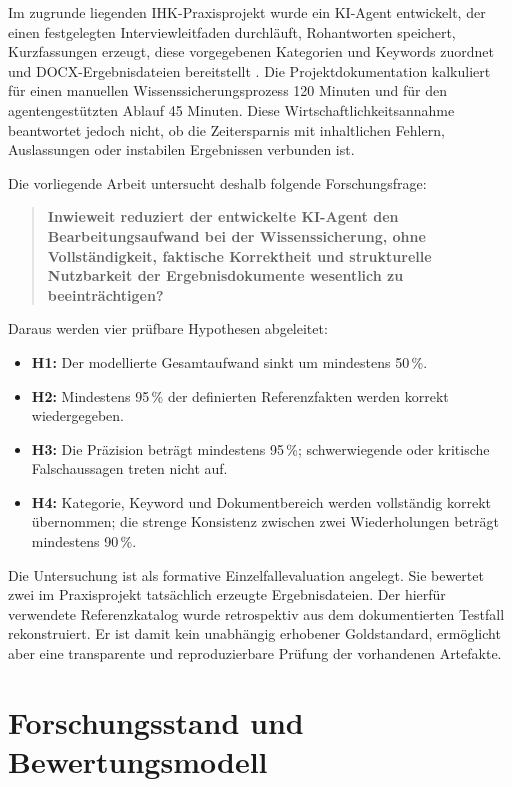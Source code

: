 \documentclass[
  10pt,
  ngerman,
  a4paper,
  toc=graduated,
  numbers=noenddot,
  headings=standardclasses
]{scrartcl}
\newcommand{\pct}[1]{#1\,\%}
\begin{document}
Im zugrunde liegenden IHK-Praxisprojekt wurde ein KI-Agent entwickelt, der einen festgelegten Interviewleitfaden durchläuft, Rohantworten speichert, Kurzfassungen erzeugt, diese vorgegebenen Kategorien und Keywords zuordnet und DOCX-Ergebnisdateien bereitstellt \cite{sommer2026projekt}. Die Projektdokumentation kalkuliert für einen manuellen Wissenssicherungsprozess 120 Minuten und für den agentengestützten Ablauf 45 Minuten. Diese Wirtschaftlichkeitsannahme beantwortet jedoch nicht, ob die Zeitersparnis mit inhaltlichen Fehlern, Auslassungen oder instabilen Ergebnissen verbunden ist.

Die vorliegende Arbeit untersucht deshalb folgende Forschungsfrage:

\begin{quote}
\textbf{Inwieweit reduziert der entwickelte KI-Agent den Bearbeitungsaufwand bei der Wissenssicherung, ohne Vollständigkeit, faktische Korrektheit und strukturelle Nutzbarkeit der Ergebnisdokumente wesentlich zu beeinträchtigen?}
\end{quote}

Daraus werden vier prüfbare Hypothesen abgeleitet:

\begin{itemize}
  \item \textbf{H1:} Der modellierte Gesamtaufwand sinkt um mindestens \pct{50}.
  \item \textbf{H2:} Mindestens \pct{95} der definierten Referenzfakten werden korrekt wiedergegeben.
  \item \textbf{H3:} Die Präzision beträgt mindestens \pct{95}; schwerwiegende oder kritische Falschaussagen treten nicht auf.
  \item \textbf{H4:} Kategorie, Keyword und Dokumentbereich werden vollständig korrekt übernommen; die strenge Konsistenz zwischen zwei Wiederholungen beträgt mindestens \pct{90}.
\end{itemize}

Die Untersuchung ist als formative Einzelfallevaluation angelegt. Sie bewertet zwei im Praxisprojekt tatsächlich erzeugte Ergebnisdateien. Der hierfür verwendete Referenzkatalog wurde retrospektiv aus dem dokumentierten Testfall rekonstruiert. Er ist damit kein unabhängig erhobener Goldstandard, ermöglicht aber eine transparente und reproduzierbare Prüfung der vorhandenen Artefakte.

\newpage
\section{Forschungsstand und Bewertungsmodell}
\end{document}
